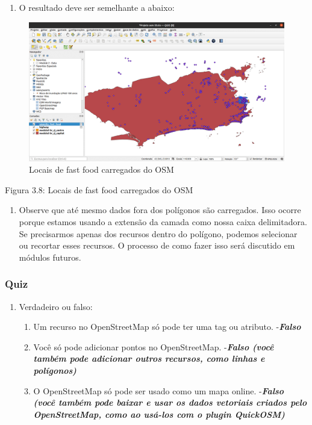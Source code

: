 \documentclass[
]{krantz}
\providecommand{\tightlist}{%
  \setlength{\itemsep}{0pt}\setlength{\parskip}{0pt}}
\begin{document}
\begin{enumerate}
\def\labelenumi{\arabic{enumi}.}
\setcounter{enumi}{8}
\tightlist
\item
  O resultado deve ser semelhante a abaixo:
\end{enumerate}

\begin{figure}
\centering
\includegraphics{media/modulo3/quickosm-7.png}
\caption{Locais de fast food carregados do OSM}
\end{figure}

Figura 3.8: Locais de fast food carregados do OSM

\begin{enumerate}
\def\labelenumi{\arabic{enumi}.}
\setcounter{enumi}{9}
\tightlist
\item
  Observe que até mesmo dados fora dos polígonos são carregados. Isso ocorre porque estamos usando a extensão da camada como nossa caixa delimitadora. Se precisarmos apenas dos recursos dentro do polígono, podemos selecionar ou recortar esses recursos. O processo de como fazer isso será discutido em módulos futuros.
\end{enumerate}

\hypertarget{quiz-9}{%
\subsubsection{Quiz}\label{quiz-9}}

\begin{enumerate}
\def\labelenumi{\arabic{enumi}.}
\item
  Verdadeiro ou falso:

  \begin{enumerate}
  \def\labelenumii{\arabic{enumii}.}
  \tightlist
  \item
    Um recurso no OpenStreetMap só pode ter uma tag ou atributo. -\textbf{\emph{Falso}}
  \item
    Você só pode adicionar pontos no OpenStreetMap. -\textbf{\emph{Falso (você também pode adicionar outros recursos, como linhas e polígonos)}}
  \item
    O OpenStreetMap só pode ser usado como um mapa online. -\textbf{\emph{Falso (você também pode baixar e usar os dados vetoriais criados pelo OpenStreetMap, como ao usá-los com o plugin QuickOSM)}}
  \end{enumerate}
\end{enumerate}
\end{document}
